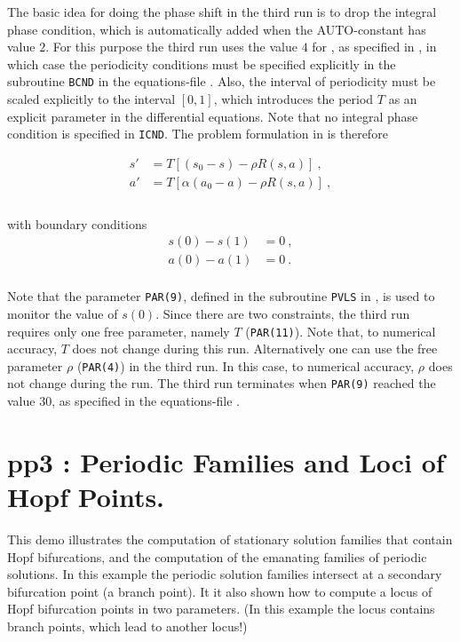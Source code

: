 \documentclass[12pt]{report}
\begin{document}
The basic idea for doing the phase shift in the third run is to drop the integral 
phase condition, which is automatically added when the {\cal AUTO}-constant 
has value $2$. For this purpose the third run uses the value $4$ for ,
as specified in , in which case the periodicity conditions must be
specified explicitly in the subroutine {\tt BCND} in the equations-file . 
Also, the interval of periodicity must be scaled explicitly to the interval $[0,1]$, 
which introduces the period $T$ as an explicit parameter in the differential equations.
Note that no integral phase condition is specified in {\tt ICND}. 
The problem formulation in  is therefore

\begin{equation} \begin{array}{cl}
 s' &= T[(s_{0} - s) - \rho R (s,a)]~, \\
 a' &= T[\alpha (a_{0} - a) - \rho R (s,a)]~, \\
\end{array} \end{equation}
\\
with boundary conditions
\\
\begin{equation} \begin{array}{cl}
 s(0) - s(1) &= 0~, \\
 a(0) - a(1) &= 0~. \\
\end{array} \end{equation}

Note that the \AUTO parameter {\tt PAR(9)}, defined in the subroutine
{\tt PVLS} in , is used to monitor the value of $s(0)$.
Since there are two constraints, the third run requires only one free 
parameter, namely $T$ ({\tt PAR(11)}). Note that, to numerical accuracy, 
$T$ does not change during this run.
Alternatively one can use the free parameter $\rho$ ({\tt PAR(4)})
in the third run. In this case, to numerical accuracy, $\rho$ does not 
change during the run.
The third run terminates when {\tt PAR(9)} reached the value $30$, as 
specified in the equations-file .

\newpage
\section{ pp3 : Periodic Families and Loci of Hopf Points.} \label{sec:Demos_pp3}
This demo illustrates the computation of stationary solution families
that contain Hopf bifurcations, and the computation of the emanating
families of periodic solutions.  In this example the periodic 
solution families intersect at a secondary bifurcation point 
(a branch point). It it also shown how to compute a locus of Hopf bifurcation
points in two parameters. (In this example the locus contains branch points,
which lead to another locus!)
\end{document}
